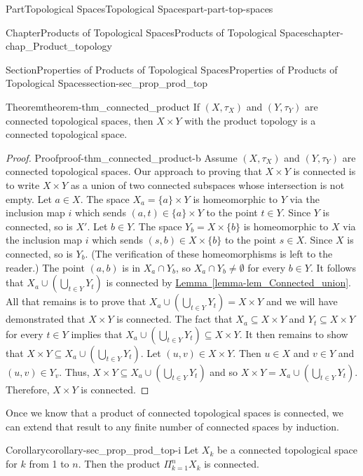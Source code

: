 \documentclass[oneside,10pt,]{book}
\newcommand{\xreffont}{\relax}
\numberwithin{equation}{chapter}
\begin{document}
\begin{partptx}{Part}{Topological Spaces}{}{Topological Spaces}{}{}{part-part-top-spaces}
\begin{chapterptx}{Chapter}{Products of Topological Spaces}{}{Products of Topological Spaces}{}{}{chapter-chap_Product_topology}
\begin{sectionptx}{Section}{Properties of Products of Topological Spaces}{}{Properties of Products of Topological Spaces}{}{}{section-sec_prop_prod_top}
\begin{theorem}{Theorem}{}{}{theorem-thm_connected_product}%
If \((X, \tau_X)\) and \((Y, \tau_Y)\) are connected topological spaces, then \(X \times Y\) with the product topology is a connected topological space.%
\end{theorem}
\begin{proof}{Proof}{}{proof-thm_connected_product-b}
Assume \((X, \tau_X)\) and \((Y, \tau_Y)\) are connected topological spaces. Our approach to proving that \(X \times Y\) is connected is to write \(X \times Y\) as a union of two connected subspaces whose intersection is not empty. Let \(a \in X\). The space \(X_a = \{a\} \times Y\) is homeomorphic to \(Y\) via the inclusion map \(i\) which sends \((a,t) \in \{a\} \times Y\) to the point \(t \in Y\). Since \(Y\) is connected, so is \(X'\). Let \(b \in Y\). The space \(Y_b = X \times \{b\}\) is homeomorphic to \(X\) via the inclusion map \(i\) which sends \((s,b) \in X \times \{b\}\) to the point \(s \in X\). Since \(X\) is connected, so is \(Y_b\). (The verification of these homeomorphisms is left to the reader.) The point \((a,b)\) is in \(X_a \cap Y_b\), so \(X_a \cap Y_b \neq \emptyset\) for every \(b \in Y\). It follows that \(X_a \cup \left( \bigcup_{t \in Y} Y_t \right)\) is connected by \hyperref[lemma-lem_Connected_union]{Lemma~{\xreffont\ref{lemma-lem_Connected_union}}}. All that remains is to prove that \(X_a \cup \left( \bigcup_{t \in Y} Y_t \right) = X \times Y\) and we will have demonstrated that \(X \times Y\) is connected. The fact that \(X_a \subseteq X \times Y\) and \(Y_t \subseteq X \times Y\) for every \(t \in Y\) implies that \(X_a \cup \left( \bigcup_{t \in Y} Y_t \right) \subseteq X \times Y\). It then remains to show that \(X \times Y \subseteq X_a \cup \left( \bigcup_{t \in Y} Y_t \right)\). Let \((u,v) \in X \times Y\). Then \(u \in X\) and \(v \in Y\) and \((u,v) \in Y_v\). Thus, \(X \times Y \subseteq X_a \cup \left( \bigcup_{t \in Y} Y_t \right)\) and so \(X \times Y = X_a \cup \left( \bigcup_{t \in Y} Y_t \right)\). Therefore, \(X \times Y\) is connected.%
\end{proof}
Once we know that a product of connected topological spaces is connected, we can extend that result to any finite number of connected spaces by induction.%
\begin{corollary}{Corollary}{}{}{corollary-sec_prop_prod_top-i}%
Let \(X_{k}\) be a connected topological space for \(k\) from 1 to \(n\). Then the product \(\Pi_{k=1}^n X_k\) is connected.%
\end{corollary}

\end{sectionptx}
\end{chapterptx}
\end{partptx}
\end{document}
